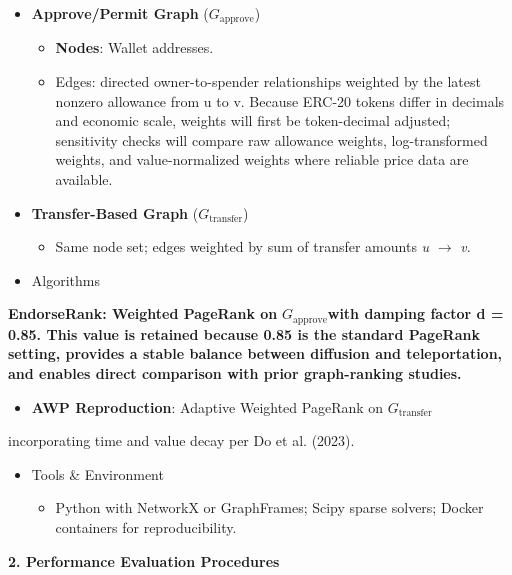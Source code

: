 \documentclass[12pt]{article}
\newcommand{\proposalSubheading}[1]{%
  \par\addvspace{0.38\baselineskip}%
  \noindent\textbf{#1}\par\nobreak\addvspace{0.08\baselineskip}%
}
\begin{document}
\begin{itemize}
\item[\textbullet] \textbf{Approve/Permit Graph }($G_{\text{approve}}$)
\begin{itemize}
\item[\textendash] \textbf{Nodes}: Wallet addresses.
\item[\textendash] Edges: directed owner-to-spender relationships weighted by the latest nonzero allowance from u to v. Because ERC-20 tokens differ in decimals and economic scale, weights will first be token-decimal adjusted; sensitivity checks will compare raw allowance weights, log-transformed weights, and value-normalized weights where reliable price data are available.
\end{itemize}
\item[\textbullet] \textbf{Transfer-Based Graph }($G_{\text{transfer}}$)
\begin{itemize}
\item[\textendash] Same node set; edges weighted by sum of transfer amounts \emph{u }\(\to\) \emph{v}.
\end{itemize}
\item[\textbullet] Algorithms
\end{itemize}
\textbf{EndorseRank: Weighted PageRank on }$G_{\text{approve}}$\textbf{with damping factor d = 0.85. This value is retained because 0.85 is the standard PageRank setting, provides a stable balance between diffusion and teleportation, and enables direct comparison with prior graph-ranking studies.}


\begin{itemize}
\item[\textendash] \textbf{AWP Reproduction}: Adaptive Weighted PageRank on $G_{\text{transfer}}$
\end{itemize}
incorporating time and value decay per Do et al. (2023).


\begin{itemize}
\item[\textbullet] Tools \& Environment
\begin{itemize}
\item[\textendash] Python with NetworkX or GraphFrames; Scipy sparse solvers; Docker containers for reproducibility.
\end{itemize}
\end{itemize}
\proposalSubheading{2. Performance Evaluation Procedures}
\end{document}
